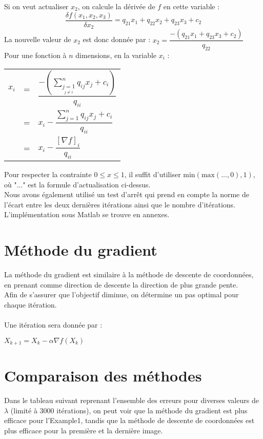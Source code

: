 \documentclass[12pt, a4paper]{report}
\begin{document}
Si on veut actualiser $x_2$, on calcule la dérivée de $f$ en cette variable :
\[\dfrac{\delta f(x_1,x_2,x_3)}{\delta x_2} = q_{21}x_1 + q_{22}x_2 + q_{23}x_3 + c_2\]
La nouvelle valeur de $x_2$ est donc donnée par :
\(x_2 = \dfrac{-(q_{21}x_1 + q_{23}x_3 + c_2)}{q_{22}}\) \\
Pour une fonction à $n$ dimensions, en la variable $x_i$ :\\
\begin{center}
\begin{tabular}{rcl}
$x_i$ & = & $\dfrac{-\left(\sum\limits_{\underset{j \neq i}{j = 1}}^n q_{ij}x_j + c_i\right)}{q_{ii}}$ \\
 & = & $x_i - \dfrac{\sum\limits_{j = 1}^nq_{ij}x_j + c_i}{q_{ii}}$ \\
 & = & $x_i - \dfrac{\left[\nabla f\right]_i}{q_{ii}}$ \\
\end{tabular}
\end{center}

Pour respecter la contrainte $0 \leq x \leq 1$, il suffit d'utiliser \(\text{min}(\text{max}(..., 0), 1)\), où "..." est la formule d'actualisation ci-dessus. \\

Nous avons également utilisé un test d'arrêt qui prend en compte la norme de l'écart entre les deux dernières itérations ainsi que le nombre d'itérations. \\
L'implémentation sous Matlab se trouve en annexes.

\section{Méthode du gradient}
La méthode du gradient est similaire à la méthode de descente de coordonnées, en prenant comme direction de descente la direction de plus grande pente.\\
Afin de s'assurer que l'objectif diminue, on détermine un pas optimal pour chaque itération.\\
\\Une itération sera donnée par :
\begin{center}
$X_{k+1}=X_k - \alpha \nabla f(X_k)$
\end{center}

\section{Comparaison des méthodes}
Dans le tableau suivant reprenant l'ensemble des erreurs pour diverses valeurs de $\lambda$ (limité à 3000 itérations), on peut voir que la méthode du gradient est plus efficace pour l'Example1, tandis que la méthode de descente de coordonnées est plus efficace pour la première et la dernière image. \\
\end{document}
